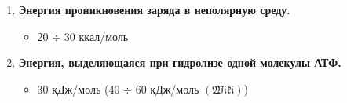 \documentclass[11pt,twocolumn]{report}
\newcommand{\Wiki}[0]{$\mathfrak{(Wiki)}$}
\begin{document}
\begin{enumerate}
\item \textbf{Энергия проникновения заряда в неполярную среду.}
\begin{itemize}
    \item 20 $\div$ 30 ккал/моль
\end{itemize}
\pagebreak[2]

\item \textbf{Энергия, выделяющаяся при гидролизе одной молекулы АТФ.}
\begin{itemize}
    \item 30 кДж/моль (40 $\div$ 60 кДж/моль \Wiki)
\end{itemize}
\pagebreak[2]


\end{enumerate}
\end{document}
